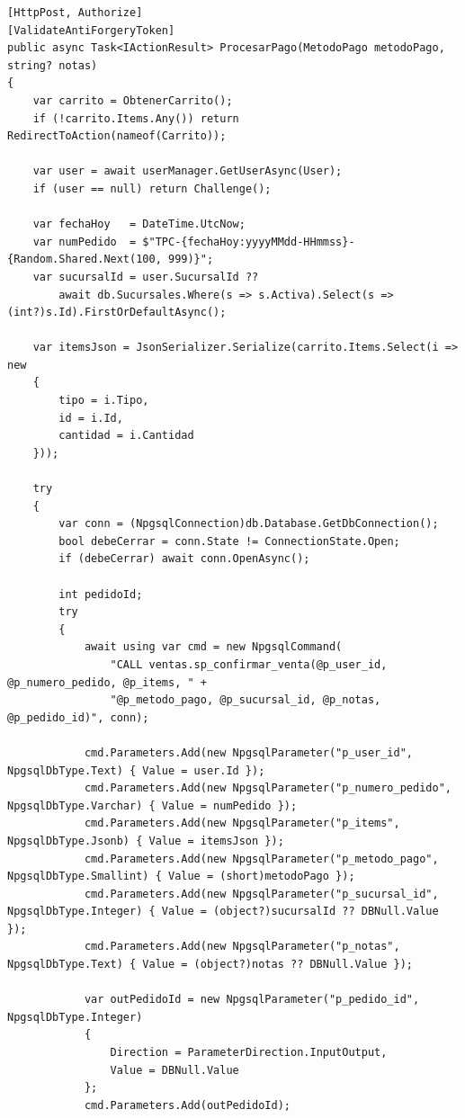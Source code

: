 \begin{lstlisting}[language={[Sharp]C}, caption={Invocacion real de CALL ventas.sp\_confirmar\_venta en TiendaController.cs}, label=lst:tienda-sp]
[HttpPost, Authorize]
[ValidateAntiForgeryToken]
public async Task<IActionResult> ProcesarPago(MetodoPago metodoPago, string? notas)
{
    var carrito = ObtenerCarrito();
    if (!carrito.Items.Any()) return RedirectToAction(nameof(Carrito));

    var user = await userManager.GetUserAsync(User);
    if (user == null) return Challenge();

    var fechaHoy   = DateTime.UtcNow;
    var numPedido  = $"TPC-{fechaHoy:yyyyMMdd-HHmmss}-{Random.Shared.Next(100, 999)}";
    var sucursalId = user.SucursalId ??
        await db.Sucursales.Where(s => s.Activa).Select(s => (int?)s.Id).FirstOrDefaultAsync();

    var itemsJson = JsonSerializer.Serialize(carrito.Items.Select(i => new
    {
        tipo = i.Tipo,
        id = i.Id,
        cantidad = i.Cantidad
    }));

    try
    {
        var conn = (NpgsqlConnection)db.Database.GetDbConnection();
        bool debeCerrar = conn.State != ConnectionState.Open;
        if (debeCerrar) await conn.OpenAsync();

        int pedidoId;
        try
        {
            await using var cmd = new NpgsqlCommand(
                "CALL ventas.sp_confirmar_venta(@p_user_id, @p_numero_pedido, @p_items, " +
                "@p_metodo_pago, @p_sucursal_id, @p_notas, @p_pedido_id)", conn);

            cmd.Parameters.Add(new NpgsqlParameter("p_user_id", NpgsqlDbType.Text) { Value = user.Id });
            cmd.Parameters.Add(new NpgsqlParameter("p_numero_pedido", NpgsqlDbType.Varchar) { Value = numPedido });
            cmd.Parameters.Add(new NpgsqlParameter("p_items", NpgsqlDbType.Jsonb) { Value = itemsJson });
            cmd.Parameters.Add(new NpgsqlParameter("p_metodo_pago", NpgsqlDbType.Smallint) { Value = (short)metodoPago });
            cmd.Parameters.Add(new NpgsqlParameter("p_sucursal_id", NpgsqlDbType.Integer) { Value = (object?)sucursalId ?? DBNull.Value });
            cmd.Parameters.Add(new NpgsqlParameter("p_notas", NpgsqlDbType.Text) { Value = (object?)notas ?? DBNull.Value });

            var outPedidoId = new NpgsqlParameter("p_pedido_id", NpgsqlDbType.Integer)
            {
                Direction = ParameterDirection.InputOutput,
                Value = DBNull.Value
            };
            cmd.Parameters.Add(outPedidoId);


\end{lstlisting}
